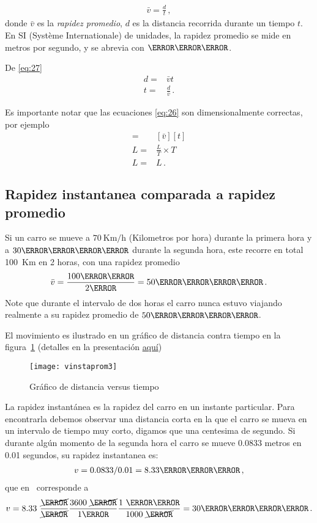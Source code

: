 \begin{align}
  \label{eq:27}
\bar{v}=\frac{d}{t}\,,
\end{align}
donde $\bar{v}$ es la \emph{rapidez promedio}, $d$ es la distancia
recorrida durante un tiempo $t$. En SI (Système Internationale) de
unidades, la rapidez promedio se mide en metros por segundo, y se
abrevia con $\meter\per\second$.

De \eqref{eq:27}
\begin{align}
  \label{eq:26}
  d=&\bar{v} t\nonumber\\
  t=&\frac{d}{\bar{v}}\,.
\end{align}

Es importante notar que las ecuaciones \eqref{eq:26} son dimensionalmente correctas, por ejemplo
\begin{align}
  [d]=&  \left[\bar{v}   \right] [t]\nonumber\\
  L=&\frac{L}{T}\times T\nonumber\\
  L=&L\,.
\end{align}

\subsection{Rapidez instantanea comparada a rapidez promedio}

Si un carro se mueve a $70\ \text{Km/h}$ (Kilometros por hora) durante la primera hora y a $30\kilo\meter\per\hour$
durante la segunda hora, este recorre en total 100~Km en 2 horas, con una rapidez promedio
\begin{align}
  \bar{v}=\frac{100\kilo\meter}{2\hour}=50\kilo\meter\per\hour\,.
\end{align}
Note que durante el intervalo de dos horas el carro nunca estuvo viajando realmente a su rapidez promedio de $50\kilo\meter\per\hour$.

El movimiento es ilustrado en un gráfico de distancia contra tiempo en la figura~\ref{fig:vinstaprom3} (detalles en la presentación \href{http://goo.gl/3eqUa}{aquí})

\begin{frame}[plain]
\begin{figure}
  \centering
  \texttt{[image: vinstaprom3]}
  \caption{Gráfico de distancia versus tiempo}
  \label{fig:vinstaprom3}
\end{figure}
\end{frame}


La rapidez instantánea es la rapidez del carro en un instante particular. Para encontrarla debemos observar una distancia corta en la que el carro se mueva en un intervalo de tiempo muy corto, digamos que una centesima de segundo. Si durante algún momento de la segunda hora el carro se mueve 0.0833 metros en 0.01 segundos, su rapidez instantanea es:
\begin{align}
  v=0.0833/0.01=8.33 \meter\per\second\,,
\end{align}
que en \kilo\meter\per\hour\ corresponde a
\begin{align}
  v=8.33\ \frac{\cancel{\meter}}{\cancel{\second}}\frac{3600\ \cancel{\second}}{1\hour}\frac{1\ \kilo\meter}{1000\ \cancel{\meter}}=30\kilo\meter\per\hour\,.
\end{align}

